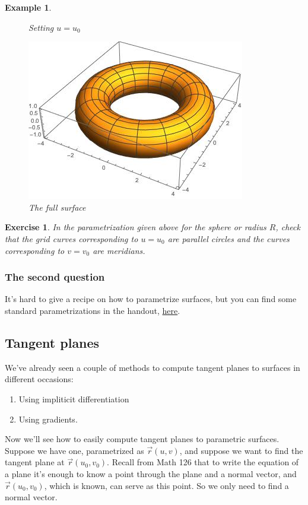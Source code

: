 \documentclass[12pt]{article}
\newcommand{\vr}{\vec{r}{}}
\newtheorem{example}{Example}
\newtheorem{exercise}{Exercise}
\begin{document}
\begin{example}
\begin{figure}[h]
  \caption{Setting $u=u_0$}\label{fig4}
\endminipage\hfill
{}%
  \includegraphics[width=\linewidth]{torus.jpeg}
  \caption{The full surface}\label{fig5}
\endminipage
\end{figure}
\end{example}


\begin{exercise}
In the parametrization given above for the sphere or radius $R$, check that the grid curves corresponding to $u=u_0$ are parallel circles and the curves corresponding to $v=v_0$ are meridians.
\end{exercise}

\subsubsection*{The second question}
It's hard to give a recipe on how to parametrize surfaces, but you can find some standard parametrizations in the handout, \href{http://sites.math.washington.edu/~neptamin/324Au17/Notes/Handout2/Handout2.pdf}{here}.

\subsection*{Tangent planes}
We've already seen a couple of methods to compute tangent planes to surfaces in different occasions:
\begin{enumerate}
\item Using impliticit differentiation
\item Using gradients.
\end{enumerate}
Now we'll see how to easily compute tangent planes to parametric surfaces. Suppose we have one, parametrized as $\vr(u,v)$, and suppose we want to find the tangent plane at $\vr(u_0,v_0)$. Recall from Math 126 that to write the equation of a plane it's enough to know a point through the plane and a normal vector, and $\vr(u_0,v_0)$, which is known, can serve as this point. So we only need to find a normal vector.
\end{document}
